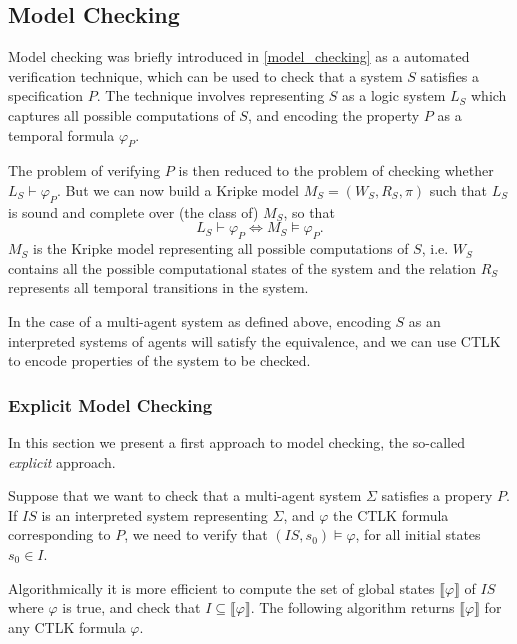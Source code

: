 \documentclass[11pt]{article}
\begin{document}
\subsection{Model Checking}

Model checking was briefly introduced in \ref{model_checking} as a automated verification technique, which can be used to check that a system $S$ satisfies a specification $P$. The technique involves representing $S$ as a logic system $L_S$ which captures all possible computations of $S$, and encoding the property $P$ as a temporal formula $\varphi_P$. 

The problem of verifying $P$ is then reduced to the problem of checking whether $L_S \vdash \varphi_P $. But we can now build a Kripke model $M_S = (W_S, R_S, \pi)$ such that $L_S$ is sound and complete over (the class of) $M_S$, so that $$L_S \vdash \varphi_P \Leftrightarrow M_S \models \varphi_P .$$ 
$M_S$ is the Kripke model representing all possible computations of $S$, i.e. $W_S$ contains all the possible computational states of the system and the relation $R_S$ represents all temporal transitions in the system. 

In the case of a multi-agent system as defined above, encoding $S$ as an interpreted systems of agents will satisfy the equivalence, and we can use CTLK to encode properties of the system to be checked. 

\subsubsection{Explicit Model Checking}

\label{explicit}
In this section we present a first approach to model checking, the so-called \textit{explicit} approach.

Suppose that we want to check that a multi-agent system $\Sigma$ satisfies a propery $P$. If $IS$ is an interpreted system representing $\Sigma$, and $\varphi$ the CTLK formula corresponding to $P$, we need to verify that $(IS, s_0) \models \varphi$, for all initial states $s_0 \in I$.

Algorithmically it is more efficient \cite{need ref} to compute the set of global states $\llbracket\varphi\rrbracket$ of $IS$ where $\varphi$ is true, and check that $I \subseteq \llbracket\varphi\rrbracket$. 
The following algorithm returns $\llbracket\varphi\rrbracket$ for any CTLK formula $\varphi$.
\end{document}
